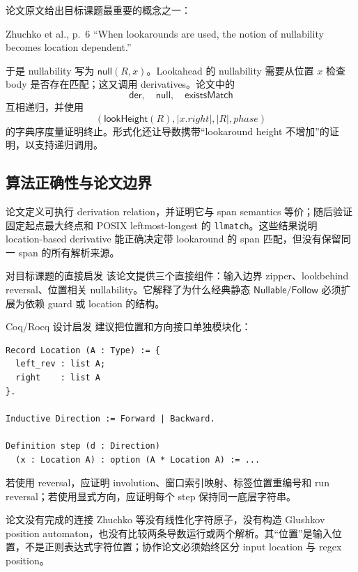 \documentclass[UTF8,a4paper,12pt]{ctexart}
\begin{document}
论文原文给出目标课题最重要的概念之一：
\begin{paperquote}{Zhuchko et al., p.~6}
``When lookarounds are used, the notion of nullability becomes location dependent.''
\end{paperquote}

于是 nullability 写为 $\mathsf{null}(R,x)$。Lookahead 的 nullability 需要从位置 $x$ 检查 body 是否存在匹配；这又调用 derivatives。论文中的
\[
\mathsf{der},\quad\mathsf{null},\quad\mathsf{existsMatch}
\]
互相递归，并使用
\[
(\mathsf{lookHeight}(R),|x.right|,|R|,phase)
\]
的字典序度量证明终止。形式化还让导数携带“lookaround height 不增加”的证明，以支持递归调用。

\subsection{算法正确性与论文边界}

论文定义可执行 derivation relation，并证明它与 span semantics 等价；随后验证固定起点最大终点和 POSIX leftmost-longest 的 \texttt{llmatch}。这些结果说明 location-based derivative 能正确决定带 lookaround 的 span 匹配，但没有保留同一 span 的所有解析来源。

\begin{directlink}{对目标课题的直接启发}
该论文提供三个直接组件：输入边界 zipper、lookbehind reversal、位置相关 nullability。它解释了为什么经典静态 $\mathsf{Nullable}/\mathsf{Follow}$ 必须扩展为依赖 guard 或 location 的结构。
\end{directlink}

\begin{coqbox}{Coq/Rocq 设计启发}
建议把位置和方向接口单独模块化：
\begin{lstlisting}
Record Location (A : Type) := {
  left_rev : list A;
  right    : list A
}.

Inductive Direction := Forward | Backward.

Definition step (d : Direction)
  (x : Location A) : option (A * Location A) := ...
\end{lstlisting}
若使用 reversal，应证明 involution、窗口索引映射、标签位置重编号和 run reversal；若使用显式方向，应证明每个 step 保持同一底层字符串。
\end{coqbox}

\begin{boundarybox}{论文没有完成的连接}
Zhuchko 等没有线性化字符原子，没有构造 Glushkov position automaton，也没有比较两条导数运行或两个解析。其“位置”是输入位置，不是正则表达式字符位置；协作论文必须始终区分 input location 与 regex position。
\end{boundarybox}
\end{document}
